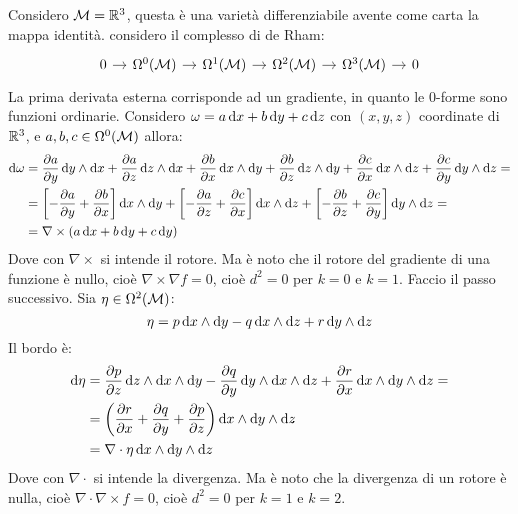 \begin{example}
  Considero $ \mathcal{M} = \mathbb{R}^{3} $, questa è una varietà differenziabile avente come
  carta la mappa identità. considero il complesso di de Rham:
  \[
    \begin{tikzcd}[nodes = {column sep = 10 pt}]
      0 \rar & \Omega^0(\M) \rar & \Omega^1(\M) \rar & \Omega^2(\M) \rar & \Omega^3(\M) \rar & 0
    \end{tikzcd}
  \]
  La prima derivata esterna corrisponde ad un gradiente, in quanto le
  $ 0 $-forme sono funzioni ordinarie. Considero
  $ \omega = a \operatorname{d}\!{x} + b \operatorname{d}\!{y} + c \operatorname{d}\!{z} $ con $ (x,y,z) $ coordinate di
  $ \mathbb{R}^{3} $, e $ a, b, c \in \Omega^0(\mathcal{M}) $ allora:
  \begin{align*}
    \d \omega & =          \frac{\partial a}{\partial y} \d y \wedge \d x + \frac{\partial a}{\partial z} \d z \wedge \d x + \frac{\partial b}{\partial x} \d x \wedge \d y +
             \frac{\partial b}{\partial z} \d z \wedge \d y + \frac{\partial c}{\partial x} \d x \wedge \d z + \frac{\partial c}{\partial y} \d y \wedge \d z = \\
         & =      \left[ - \frac{\partial a}{\partial y} + \frac{\partial b}{\partial x} \right] \d x \wedge \d y +
                 \left[ - \frac{\partial a}{\partial z} + \frac{\partial c}{\partial x} \right] \d x \wedge \d z +
                 \left[ - \frac{\partial b}{\partial z} + \frac{\partial c}{\partial y} \right] \d y \wedge \d z =                      \\
         & =  \nabla \times (a \d x + b \d y + c \d y)
  \end{align*}
  Dove con $ \nabla \times $ si intende il rotore. Ma è noto che il rotore del gradiente di una funzione è nullo,
  cioè $ \nabla \times \nabla f = 0 $, cioè $ d^2 = 0 $ per $ k = 0 $ e $ k = 1 $.
  Faccio il passo successivo. Sia $ \eta \in \Omega^2(\mathcal{M}) $:
  \[
    \eta = p \operatorname{d}\!{x} \wedge \operatorname{d}\!{y} - q \operatorname{d}\!{x} \wedge \operatorname{d}\!{z} + r \operatorname{d}\!{y} \wedge \operatorname{d}\!{z}
  \]
  Il bordo è:
  \begin{align*}
    \d \eta & = \frac{\partial p}{\partial z} \d z \wedge \d x \wedge \d y - \frac{\partial q}{\partial y} \d y \wedge \d x \wedge \d z + \frac{\partial r}{\partial x} \d x \wedge \d y \wedge \d z = \\
    & = \left( \frac{\partial r}{\partial x} + \frac{\partial q}{\partial y} + \frac{\partial p}{\partial z} \right) \d x \wedge \d y \wedge \d z\\
    & = \nabla \cdot \eta \d x \wedge \d y \wedge \d z
  \end{align*}
  Dove con $ \nabla \cdot $ si intende la divergenza. Ma è noto che la divergenza di un rotore è nulla,
  cioè $ \nabla \cdot \nabla \times f = 0 $, cioè $ d^2 = 0 $ per $ k = 1 $ e $ k = 2 $.
\end{example}
